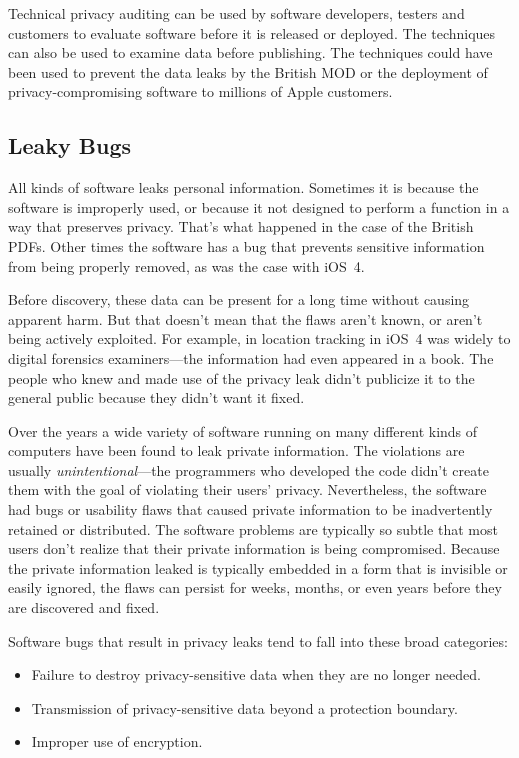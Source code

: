 Technical privacy auditing can be used by software developers, testers
and customers to evaluate software before it is released or
deployed. The techniques can also be used to examine data before
publishing. The techniques could have been used to prevent the data
leaks by the British MOD or the deployment of privacy-compromising
software to millions of Apple customers.

\subsection{Leaky Bugs}

All kinds of software leaks personal information. Sometimes it is
because the software is improperly used, or because it not designed
to perform a function in a way that preserves privacy. That's what
happened in the case of the British PDFs. Other times the software has
a bug that prevents sensitive information from being properly
removed, as was the case with iOS~4.

Before discovery, these data can be present for a long time without
causing apparent harm. But that doesn't mean that the flaws aren't
known, or aren't being actively exploited. For example, in location
tracking in iOS~4 was widely to digital forensics examiners---the
information had even appeared in a book. The people who knew and made
use of the privacy leak didn't publicize it to the general public
because they didn't want it fixed.  

Over the years a wide variety of software running on many different
kinds of computers have been found to leak private information.  The
violations are usually  
\emph{unintentional}---the programmers who developed the code didn't
create them with the goal of violating their users'
privacy. Nevertheless, the software 
had bugs or usability flaws that caused private information to be
inadvertently retained or distributed. The software problems are
typically so subtle that most users don't realize that their private
information is being compromised. Because the private information
leaked is typically embedded in a form that is invisible or easily
ignored, the flaws can persist for weeks, months, or even years before
they are discovered and fixed.

Software bugs that result in privacy leaks tend to fall into these
broad categories:

\begin{itemize}
\item Failure to destroy privacy-sensitive data when they are no longer needed.
\item Transmission of privacy-sensitive data beyond a protection boundary. 
\item Improper use of encryption.
\end{itemize}

